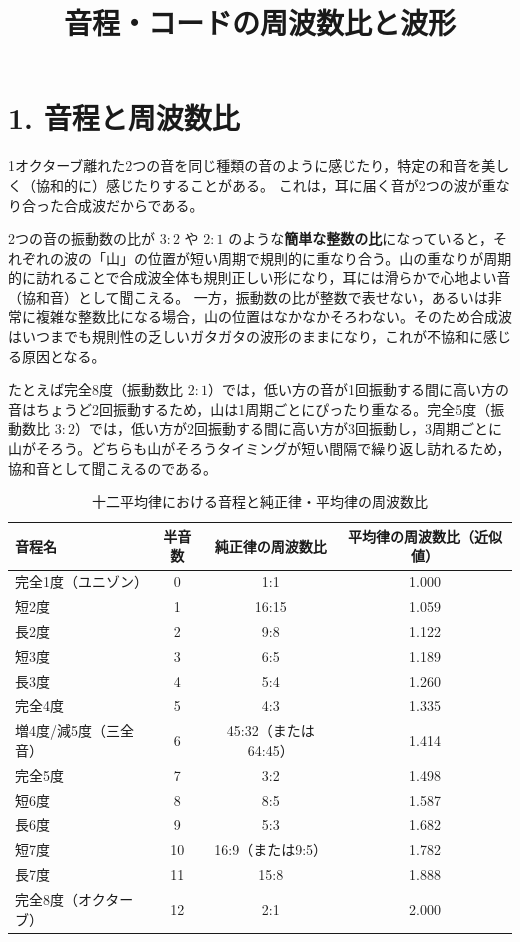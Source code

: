 \documentclass[a4paper]{ltjsarticle}
\title{音程・コードの周波数比と波形}
\author{}
\date{}
\begin{document}
\maketitle

\section*{1. 音程と周波数比}
1オクターブ離れた2つの音を同じ種類の音のように感じたり，特定の和音を美しく（協和的に）感じたりすることがある。
これは，耳に届く音が2つの波が重なり合った合成波だからである。

2つの音の振動数の比が $3:2$ や $2:1$ のような\textbf{簡単な整数の比}になっていると，それぞれの波の「山」の位置が短い周期で規則的に重なり合う。山の重なりが周期的に訪れることで合成波全体も規則正しい形になり，耳には滑らかで心地よい音（協和音）として聞こえる。
一方，振動数の比が整数で表せない，あるいは非常に複雑な整数比になる場合，山の位置はなかなかそろわない。そのため合成波はいつまでも規則性の乏しいガタガタの波形のままになり，これが不協和に感じる原因となる。

たとえば完全8度（振動数比 $2:1$）では，低い方の音が1回振動する間に高い方の音はちょうど2回振動するため，山は1周期ごとにぴったり重なる。完全5度（振動数比 $3:2$）では，低い方が2回振動する間に高い方が3回振動し，3周期ごとに山がそろう。どちらも山がそろうタイミングが短い間隔で繰り返し訪れるため，協和音として聞こえるのである。
\begin{table}[htbp]
\centering
\caption{十二平均律における音程と純正律・平均律の周波数比}
\begin{tabular}{lccc}
\toprule
音程名 & 半音数 & 純正律の周波数比 & 平均律の周波数比（近似値） \\
\midrule
完全1度（ユニゾン） & 0  & 1:1                     & 1.000 \\
短2度               & 1  & 16:15                   & 1.059 \\
長2度               & 2  & 9:8                      & 1.122 \\
短3度               & 3  & 6:5                      & 1.189 \\
長3度               & 4  & 5:4                      & 1.260 \\
完全4度             & 5  & 4:3                      & 1.335 \\
増4度/減5度（三全音） & 6  & 45:32（または64:45） & 1.414 \\
完全5度             & 7  & 3:2                      & 1.498 \\
短6度               & 8  & 8:5                      & 1.587 \\
長6度               & 9  & 5:3                      & 1.682 \\
短7度               & 10 & 16:9（または9:5）    & 1.782 \\
長7度               & 11 & 15:8                     & 1.888 \\
完全8度（オクターブ） & 12 & 2:1                     & 2.000 \\
\bottomrule
\end{tabular}
\end{table}
\end{document}
